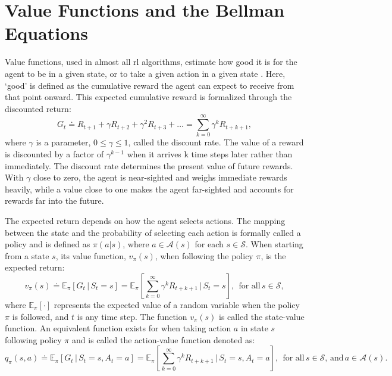 \section{Value Functions and the Bellman Equations}
\label{sec:valuefunctionbellman}
Value functions, used in almost all \acrshort{rl} algorithms, estimate how good it is for the agent to be in a given state, or to take a given action in a given state \citep[Chapter~3]{suttonReinforcementLearningIntroduction2020}. Here, `good' is defined as the cumulative reward the agent can expect to receive from that point onward. This expected cumulative reward is formalized through the discounted return:
\begin{equation}\label{eq:discounted_return}
	G_t \doteq R_{t+1} + \gamma R_{t+2} + \gamma^{2} R_{t+3} + \dots = \sum_{k=0}^{\infty} \gamma^{k} R_{t+k+1},
\end{equation}
where $\gamma$ is a parameter, $0 \leq \gamma \leq 1$, called the discount rate. The value of a reward is discounted by a factor of $\gamma^{k-1}$ when it arrives k time steps later rather than immediately. The discount rate determines the present value of future rewards. With $\gamma$ close to zero, the agent is near-sighted and weighs immediate rewards heavily, while a value close to one makes the agent far-sighted and accounts for rewards far into the future.

The expected return depends on how the agent selects actions. The mapping between the state and the probability of selecting each action is formally called a policy and is defined as $\pi{\left(a|s\right)}$, where $a \in \mathcal{A}(s)$ for each $s \in \mathcal{S}$. When starting from a state $s$, its value function, $	v_\pi\left(s\right)$, when following the policy $\pi$, is the expected return:
\begin{equation}\label{eq:state_value_function}
	v_\pi\left(s\right) \doteq \mathbb{E}_\pi\left[G_t\,|\,S_t = s\right] = \mathbb{E}_\pi\left[\sum_{k=0}^{\infty} \gamma^k R_{t+k+1}\,|\,S_t = s \right],\;\,\text{for all}\, s \in \mathcal{S},
\end{equation}
where $\mathbb{E}_\pi[\cdot]$ represents the expected value of a random variable when the policy $\pi$ is followed, and $t$ is any time step. The function $v_\pi\left(s\right)$ is called the state-value function. An equivalent function exists for when taking action $a$ in state $s$ following policy $\pi$ and is called the action-value function denoted as:
\begin{equation}\label{eq:action_value_function}
	q_\pi\left(s, a\right) \doteq \mathbb{E}_\pi\left[G_t\,|\,S_t = s, A_t = a\right] = \mathbb{E}_\pi\left[\sum_{k=0}^{\infty} \gamma^k R_{t+k+1}\,|\,S_t = s, A_t = a\right],\;\,\text{for all}\, s \in \mathcal{S},\,\text{and}\, a \in \mathcal{A}(s).
\end{equation}


